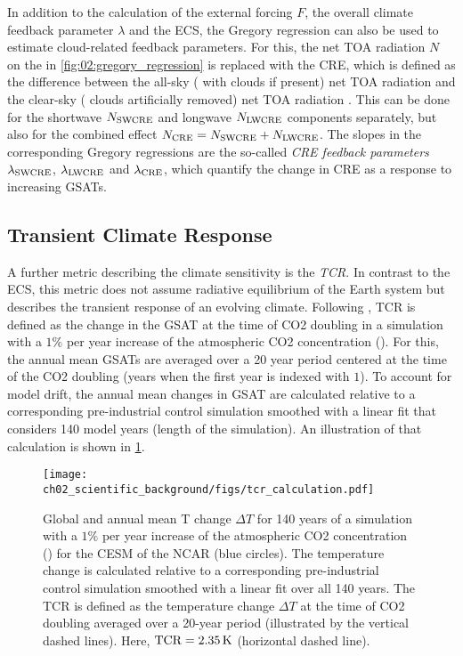 In addition to the calculation of the external forcing $F$, the overall climate
feedback parameter $\lambda$ and the \ac{ECS}, the Gregory regression can also
be used to estimate cloud-related feedback parameters. For this, the net
\ac{TOA} radiation $N$ on the \yaxis{} in \cref{fig:02:gregory_regression} is
replaced with the \ac{CRE}, which is defined as the difference between the
all-sky (\ie{} with clouds if present) net \ac{TOA} radiation and the clear-sky
(\ie{} clouds artificially removed) net \ac{TOA} radiation
\autocite{Andrews2012}. This can be done for the shortwave $N_\mathtxt{SWCRE}$
and longwave $N_\mathtxt{LWCRE}$ components separately, but also for the
combined effect $N_\mathtxt{CRE} = N_\mathtxt{SWCRE} + N_\mathtxt{LWCRE}$. The
slopes in the corresponding Gregory regressions are the so-called
\emph{\ac{CRE} feedback parameters} $\lambda_\mathtxt{SWCRE}$,
$\lambda_\mathtxt{LWCRE}$ and $\lambda_\mathtxt{CRE}$, which quantify the
change in \ac{CRE} as a response to increasing \acp{GSAT}.


\subsection{Transient Climate Response}
\label{subsec:02:tcr}

A further metric describing the climate sensitivity is the \emph{\ac{TCR}}. In
contrast to the \ac{ECS}, this metric does not assume radiative equilibrium of
the Earth system but describes the transient response of an evolving climate.
Following \textcite{Bindoff2013}, \ac{TCR} is defined as the change in the
\ac{GSAT} at the time of \ac{CO2} doubling in a simulation with a $1 \unit{\%}$
per year increase of the atmospheric \ac{CO2} concentration (\onepctcotwo{}).
For this, the annual mean \acp{GSAT} are averaged over a 20 year period
centered at the time of the \ac{CO2} doubling (years  when the
first year is indexed with $1$). To account for model drift, the annual mean
changes in \ac{GSAT} are calculated relative to a corresponding pre-industrial
control simulation smoothed with a linear fit that considers 140 model years
(length of the \onepctcotwo{} simulation). An illustration of that calculation
is shown in \cref{fig:02:tcr}.

\begin{figure}[t]
  \centering
  \texttt{[image: 
    ch02\_scientific\_background/figs/tcr\_calculation.pdf]}
  \caption[
    Illustration of the definition of the \acf{TCR}.
  ]{
    Global and annual mean \acl{T} change $\Delta T$ for 140 years of a
    simulation with a $1 \unit{\%}$ per year increase of the atmospheric
    \acs{CO2} concentration (\onepctcotwo{}) for the \acf{CESM} of the
    \acf{NCAR} (blue circles). The temperature change is calculated relative to
    a corresponding pre-industrial control simulation smoothed with a linear
    fit over all 140 years. The \acf{TCR} is defined as the temperature change
    $\Delta T$ at the time of \acs{CO2} doubling averaged over a 20-year period
    (illustrated by the vertical dashed lines). Here, $\mathtxt{TCR} = 2.35
    \unit{K}$ (horizontal dashed line).
  }
  \label{fig:02:tcr}
\end{figure}


